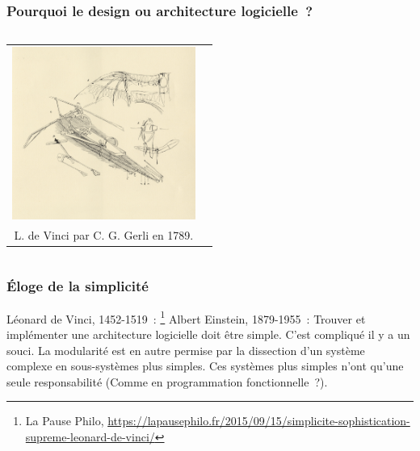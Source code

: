 \documentclass{beamer}
\begin{document}
    \begin{frame}
        \transdissolve
        \frametitle{Pourquoi le design ou architecture logicielle~?}
        \begin{columns}
            \footnotemark
            \centering
            \centering
            \begin{tabular}{cc}
                \includegraphics[width=6.0cm]{image/da-vinci-plans} \\
                L. de Vinci par C. G. Gerli en 1789.                \\
            \end{tabular}
        \end{columns}
    \end{frame}

    \begin{frame}
        \transdissolve
        \frametitle{Éloge de la simplicité}
        Léonard de Vinci, 1452-1519~: \footnote{La Pause Philo, \url{https://lapausephilo.fr/2015/09/15/simplicite-sophistication-supreme-leonard-de-vinci/}}
        \bigbreak
        Albert Einstein, 1879-1955~: 
        \bigbreak
        Trouver et implémenter une architecture logicielle doit être simple.
        C'est compliqué il y a un souci.
        \bigbreak La modularité est en autre permise par la dissection d'un système complexe en sous-systèmes plus simples.
        Ces systèmes plus simples n'ont qu'une seule responsabilité (Comme en programmation fonctionnelle~?).
    \end{frame}
\end{document}
